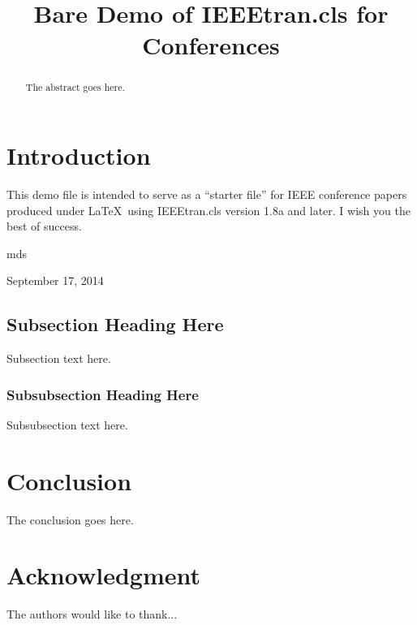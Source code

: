 \documentclass[conference]{IEEEtran}
\begin{document}
\title{Bare Demo of IEEEtran.cls for Conferences}


\author{
\and
{}
\and
{}
}


\maketitle

\begin{abstract}
The abstract goes here.
\end{abstract}


\IEEEpeerreviewmaketitle




\section{Introduction}
This demo file is intended to serve as a ``starter file''
for IEEE conference papers produced under \LaTeX\ using
IEEEtran.cls version 1.8a and later.
I wish you the best of success.

\hfill mds

\hfill September 17, 2014

\subsection{Subsection Heading Here}
Subsection text here.




\subsubsection{Subsubsection Heading Here}
Subsubsection text here.

\section{Conclusion}
The conclusion goes here.


\section*{Acknowledgment}


The authors would like to thank...




\end{document}
